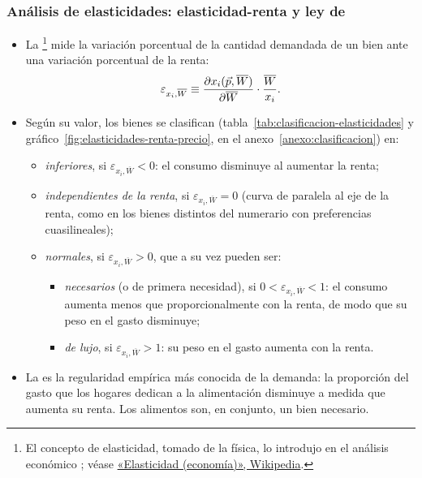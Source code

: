 \documentclass[11pt]{article}
\begin{document}
\subsubsection{Análisis de elasticidades: elasticidad-renta y ley de }\label{sec:analisis-elasticidades-elasticidad}

\begin{itemize}
\item La \footnote{El concepto de elasticidad, tomado de la física, lo introdujo en el análisis económico \nocite{Marshall1890Principles}; véase \href{https://es.wikipedia.org/wiki/Elasticidad_(econom\%C3\%ADa)}{«Elasticidad (economía)», Wikipedia}.} mide la variación porcentual de la cantidad demandada de un bien ante una variación porcentual de la renta:
  \begin{equation}
  \varepsilon_{x_i,\overline{W}}\equiv\frac{\partial x_i(\vec{p},\overline{W})}{\partial\overline{W}}\cdot\frac{\overline{W}}{x_i}. \label{eq:elasticidad-renta}
  \end{equation}
\item Según su valor, los bienes se clasifican (tabla~\ref{tab:clasificacion-elasticidades} y gráfico~\ref{fig:elasticidades-renta-precio}, en el anexo~\ref{anexo:clasificacion}) en:
  \begin{itemize}
  \item \emph{inferiores}, si $\varepsilon_{x_i,\overline{W}}<0$: el consumo disminuye al aumentar la renta;
  \item \emph{independientes de la renta}, si $\varepsilon_{x_i,\overline{W}}=0$ (curva de  paralela al eje de la renta, como en los bienes distintos del numerario con preferencias cuasilineales);
  \item \emph{normales}, si $\varepsilon_{x_i,\overline{W}}>0$, que a su vez pueden ser:
    \begin{itemize}
    \item \emph{necesarios} (o de primera necesidad), si $0<\varepsilon_{x_i,\overline{W}}<1$: el consumo aumenta menos que proporcionalmente con la renta, de modo que su peso en el gasto disminuye;
    \item \emph{de lujo}, si $\varepsilon_{x_i,\overline{W}}>1$: su peso en el gasto aumenta con la renta.
    \end{itemize}
  \end{itemize}
\item La  \textcite{Engel1857Productions} es la regularidad empírica más conocida de la demanda: la proporción del gasto que los hogares dedican a la alimentación disminuye a medida que aumenta su renta. Los alimentos son, en conjunto, un bien necesario.

\end{itemize}
\end{document}
